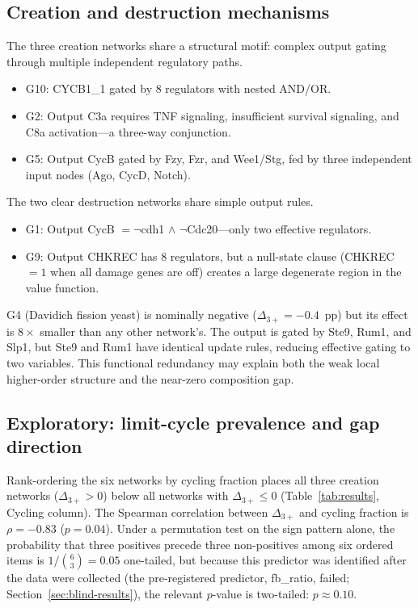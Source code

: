 \documentclass[11pt]{article}
\begin{document}
\subsection{Creation and destruction mechanisms}
\label{sec:mechanisms}

The three creation networks share a structural motif: complex output
gating through multiple independent regulatory paths.
%
\begin{itemize}
\item G10: CYCB1\_1 gated by 8 regulators with nested AND/OR.
\item G2: Output C3a requires TNF signaling, insufficient survival
  signaling, and C8a activation---a three-way conjunction.
\item G5: Output CycB gated by Fzy, Fzr, and Wee1/Stg, fed by
  three independent input nodes (Ago, CycD, Notch).
\end{itemize}
%
The two clear destruction networks share simple output rules.
%
\begin{itemize}
\item G1: Output CycB $= \neg$cdh1 $\wedge$ $\neg$Cdc20---only
  two effective regulators.
\item G9: Output CHKREC has 8 regulators, but a null-state clause
  (CHKREC $= 1$ when all damage genes are off) creates a large
  degenerate region in the value function.
\end{itemize}
%
G4 (Davidich fission yeast) is nominally negative
($\Delta_{3+} = -0.4$~pp) but its effect is $8\times$ smaller than
any other network's. The output is gated by Ste9, Rum1, and Slp1,
but Ste9 and Rum1 have identical update rules, reducing effective
gating to two variables. This functional redundancy may explain both
the weak local higher-order structure and the near-zero composition
gap.


\subsection{Exploratory: limit-cycle prevalence and gap direction}
\label{sec:cycling}

Rank-ordering the six networks by cycling fraction places all three
creation networks ($\Delta_{3+} > 0$) below all networks with
$\Delta_{3+} \leq 0$ (Table~\ref{tab:results}, Cycling column).
The Spearman correlation between $\Delta_{3+}$ and cycling fraction
is $\rho = -0.83$ ($p = 0.04$). Under a permutation test on the sign
pattern alone, the probability that three positives precede three
non-positives among six ordered items is $1/\binom{6}{3} = 0.05$
one-tailed, but because this predictor was identified after the data
were collected (the pre-registered predictor, fb\_ratio, failed;
Section~\ref{sec:blind-results}), the relevant $p$-value is
two-tailed: $p \approx 0.10$.
\end{document}
